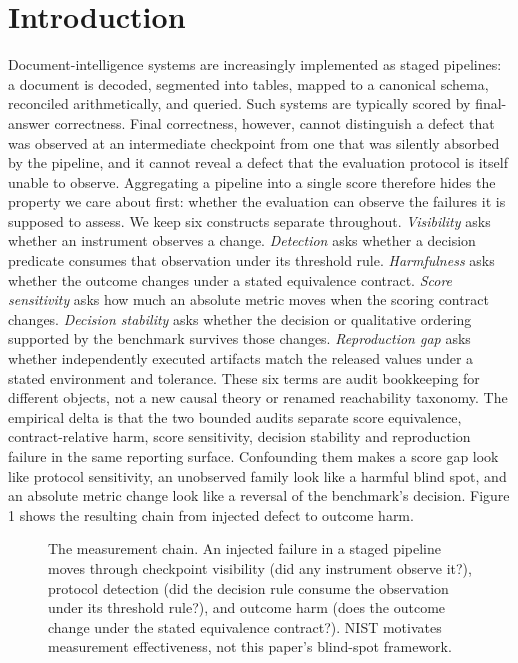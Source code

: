 \documentclass[10pt,conference]{IEEEtran}
\begin{document}
\section{Introduction}
Document-intelligence systems are increasingly implemented as staged pipelines: a document is decoded, segmented into tables, mapped to a canonical schema, reconciled arithmetically, and queried. Such systems are typically scored by final-answer correctness. Final correctness, however, cannot distinguish a defect that was observed at an intermediate checkpoint from one that was silently absorbed by the pipeline, and it cannot reveal a defect that the evaluation protocol is itself unable to observe. Aggregating a pipeline into a single score therefore hides the property we care about first: whether the evaluation can observe the failures it is supposed to assess.
We keep six constructs separate throughout. \emph{Visibility} asks whether an instrument observes a change. \emph{Detection} asks whether a decision predicate consumes that observation under its threshold rule. \emph{Harmfulness} asks whether the outcome changes under a stated equivalence contract. \emph{Score sensitivity} asks how much an absolute metric moves when the scoring contract changes. \emph{Decision stability} asks whether the decision or qualitative ordering supported by the benchmark survives those changes. \emph{Reproduction gap} asks whether independently executed artifacts match the released values under a stated environment and tolerance. These six terms are audit bookkeeping for different objects, not a new causal theory or renamed reachability taxonomy. The empirical delta is that the two bounded audits separate score equivalence, contract-relative harm, score sensitivity, decision stability and reproduction failure in the same reporting surface. Confounding them makes a score gap look like protocol sensitivity, an unobserved family look like a harmful blind spot, and an absolute metric change look like a reversal of the benchmark's decision. Figure 1 shows the resulting chain from injected defect to outcome harm.
\begin{figure}[t]
\centering

\caption{The measurement chain. An injected failure in a staged pipeline moves through checkpoint visibility (did any instrument observe it?), protocol detection (did the decision rule consume the observation under its threshold rule?), and outcome harm (does the outcome change under the stated equivalence contract?). NIST motivates measurement effectiveness, not this paper's blind-spot framework.}
\label{fig:1}
\end{figure}
\end{document}
